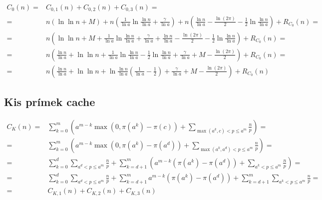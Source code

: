 \documentclass{article}
\begin{document}
\begin{align*}
C_0(n) =& C_{0,1}(n) + C_{0,2}(n) + C_{0,3}(n) = \\
=& n \left( \ln{\ln{n}} + M \right) + n \left( \frac{1}{\ln{a}}\ln{\frac{\ln{n}}{\ln{a}}} + \frac{\gamma}{\ln{a}} \right) + n \left( \frac{\ln{n}}{\ln{a}} - \frac{\ln{(2 \pi)}}{2} - \frac{1}{2} \ln{\frac{\ln{n}}{\ln{a}}} \right) + R_{C_0}(n) = \\
=& n \left( \ln{\ln{n}} + M + \frac{1}{\ln{a}}\ln{\frac{\ln{n}}{\ln{a}}} +  \frac{\gamma}{\ln{a}} + \frac{\ln{n}}{\ln{a}} - \frac{\ln{(2 \pi)}}{2} - \frac{1}{2} \ln{\frac{\ln{n}}{\ln{a}}} \right) + R_{C_0}(n) = \\
=& n \left(\frac{\ln{n}}{\ln{a}} + \ln{\ln{n}} + \frac{1}{\ln{a}}\ln{\frac{\ln{n}}{\ln{a}}} - \frac{1}{2} \ln{\frac{\ln{n}}{\ln{a}}} + \frac{\gamma}{\ln{a}} + M - \frac{\ln{(2 \pi)}}{2} \right) + R_{C_0}(n) = \\
=& n \left(\frac{\ln{n}}{\ln{a}} + \ln{\ln{n}} + \ln{\frac{\ln{n}}{\ln{a}}} \left( \frac{1}{\ln{a}} - \frac{1}{2} \right) + \frac{\gamma}{\ln{a}} + M - \frac{\ln{(2 \pi)}}{2} \right) + R_{C_0}(n)
\end{align*}

\subsection{Kis prímek cache}

\begin{align*}
C_K(n) =& \sum_{k=0}^{m} \left( a^{m-k} \max(0, \pi(a^k) - \pi(c) ) + \sum_{\max(a^k, c) < p \le a^m} \frac{n}{p} \right) = \\
=& \sum_{k=0}^{m} \left( a^{m-k} \max(0, \pi(a^k) - \pi(a^d) ) + \sum_{\max(a^k, a^d) < p \le a^m} \frac{n}{p} \right) = \\
=& \sum_{k=0}^{d} \sum_{a^d < p \le a^m} \frac{n}{p} + \sum_{k=d+1}^{m} \left( a^{m-k} ( \pi(a^k) - \pi(a^d) ) + \sum_{a^k < p \le a^m} \frac{n}{p} \right) = \\
=& \sum_{k=0}^{d} \sum_{a^d < p \le a^m} \frac{n}{p} + \sum_{k=d+1}^{m} a^{m-k} ( \pi(a^k) - \pi(a^d) ) + \sum_{k=d+1}^{m} \sum_{a^k < p \le a^m} \frac{n}{p} = \\
=& C_{K,1}(n) + C_{K,2}(n) + C_{K,3}(n)
\end{align*}
\end{document}
